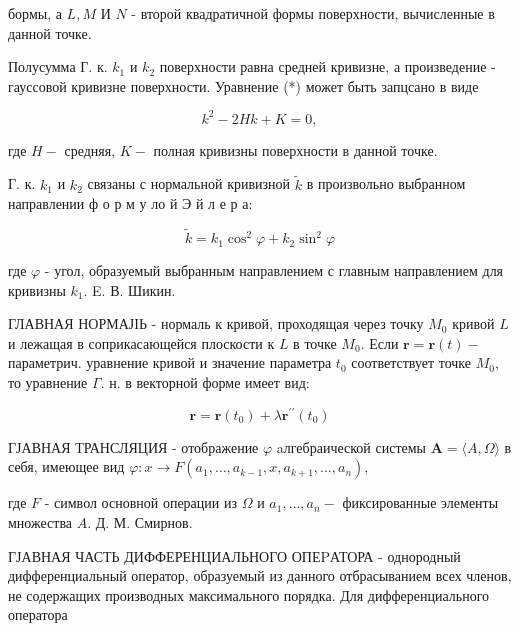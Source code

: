 \documentclass[10pt]{article}
\begin{document}
бормы, а $L, M$ И $N$ - второй квадратичной формы поверхности, вычисленные в данной точке.



Полусумма Г. к. $k_{1}$ и $k_{2}$ поверхности равна средней кривизне, а произведение - гауссовой кривизне поверхности. Уравнение (*) может быть запцсано в виде



\[

k^{2}-2 H k+K=0,

\]



где $H-$ средняя, $K-$ полная кривизны поверхности в данной точке.



Г. к. $k_{1}$ и $k_{2}$ связаны с нормальной кривизной $\tilde{k}$ в произвольно выбранном направлении ф о р м у ло й Э й л е р а:



\[

\tilde{k}=k_{1} \cos ^{2} \varphi+k_{2} \sin ^{2} \varphi

\]



где $\varphi$ - угол, образуемый выбранным направлением с главным направлением для кривизны $k_{1}$. E. В. Шикин.



ГЛАВНАЯ НОРМАЈІЬ - нормаль к кривой, проходящая через точку $M_{0}$ кривой $L$ и лежащая в соприкасающейся плоскости к $L$ в точке $M_{0}$. Если $\boldsymbol{r}=\boldsymbol{r}(t)-$ параметрич. уравнение кривой и значение параметра $t_{0}$ соответствует точке $M_{0}$, то уравнение $\Gamma$. н. в векторной форме имеет вид:



\[

\boldsymbol{r}=\boldsymbol{r}\left(t_{0}\right)+\lambda \boldsymbol{r}^{\prime \prime}\left(t_{0}\right)

\]



ГЈАВНАЯ ТРАНСЛЯЦИЯ - отображение $\varphi$ aлгебраической системы $\boldsymbol{A}=\langle A, \Omega\rangle$ в себя, имеющее вид $\varphi: x \rightarrow F\left(a_{1}, \ldots, a_{k-1}, x, a_{k+1}, \ldots, a_{n}\right)$,



где $F$ - символ основной операции из $\Omega$ и $a_{1}, \ldots, a_{n}-$ фиксированные элементы множества $A$. Д. М. Смирнов.



ГЈАВНАЯ ЧАСТЬ ДИФФЕРЕНЦИАЛЬНОГО ОПЕPАТОРА - однородный дифференциальный оператор, образуемый из данного отбрасыванием всех членов, не содержащих производных максимального порядка. Для дифференциального оператора
\end{document}
